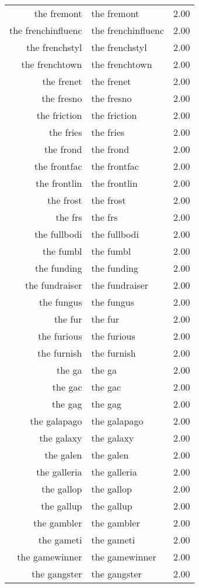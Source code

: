 \begin{table}[ht]
\begin{tabular}{rlr}
  the fremont & the fremont & 2.00 \\ 
  the frenchinfluenc & the frenchinfluenc & 2.00 \\ 
  the frenchstyl & the frenchstyl & 2.00 \\ 
  the frenchtown & the frenchtown & 2.00 \\ 
  the frenet & the frenet & 2.00 \\ 
  the fresno & the fresno & 2.00 \\ 
  the friction & the friction & 2.00 \\ 
  the fries & the fries & 2.00 \\ 
  the frond & the frond & 2.00 \\ 
  the frontfac & the frontfac & 2.00 \\ 
  the frontlin & the frontlin & 2.00 \\ 
  the frost & the frost & 2.00 \\ 
  the frs & the frs & 2.00 \\ 
  the fullbodi & the fullbodi & 2.00 \\ 
  the fumbl & the fumbl & 2.00 \\ 
  the funding & the funding & 2.00 \\ 
  the fundraiser & the fundraiser & 2.00 \\ 
  the fungus & the fungus & 2.00 \\ 
  the fur & the fur & 2.00 \\ 
  the furious & the furious & 2.00 \\ 
  the furnish & the furnish & 2.00 \\ 
  the ga & the ga & 2.00 \\ 
  the gac & the gac & 2.00 \\ 
  the gag & the gag & 2.00 \\ 
  the galapago & the galapago & 2.00 \\ 
  the galaxy & the galaxy & 2.00 \\ 
  the galen & the galen & 2.00 \\ 
  the galleria & the galleria & 2.00 \\ 
  the gallop & the gallop & 2.00 \\ 
  the gallup & the gallup & 2.00 \\ 
  the gambler & the gambler & 2.00 \\ 
  the gameti & the gameti & 2.00 \\ 
  the gamewinner & the gamewinner & 2.00 \\ 
  the gangster & the gangster & 2.00 \\ 

\end{tabular}
\end{table}
